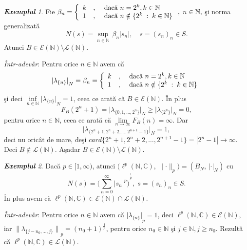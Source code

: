 \documentclass[ a4paper, 12pt]{report}
\theoremstyle{definition}
\theoremstyle{remark}
\newtheorem{exemple}{\bf Exemplul}[section]
\numberwithin{equation}{section}
\begin{document}
\begin{exemple}
Fie $\beta_n= \left\{ \begin{array}{lcl} k&,& \hbox{ dac\u a } n= 2^k, k \in \mathbb{N} \\
1 &,& \hbox{ dac\u a } n \notin \{ 2^k \; : \; k \in \mathbb{N}\} \end{array} \right., \; n \in \mathbb{N},$ \c si norma generalizat\u a
$$N(s) = \sup\limits_{n \in \mathbb{N}}\, {\beta_n  \lvert s_n \rvert}, \quad s= (s_n)_n \in S.$$
Atunci $B \in \mathcal{E}(\mathbb{N}) \setminus \mathcal{L}(\mathbb{N})$.
\end{exemple}

{\it \^ Intr-adev\u ar}: Pentru orice $n \in \mathbb{N}$ avem c\u a
$${\lvert \lambda_{\{n\}}\rvert}_N = \beta_n= \left\{ \begin{array}{lcl} k&,& \hbox{ dac\u a } n= 2^k, k \in \mathbb{N} \\
1 &,& \hbox{ dac\u a } n \notin \{ 2^k \; : \; k \in \mathbb{N}\} \end{array} \right.$$
\c si deci $\inf\limits_{n \in \mathbb{N}}{\lvert \lambda_{\{n\}}\rvert}_N=1$, ceea ce arat\u a c\u a $B \in \mathcal{E}(\mathbb{N})$. \^ In plus
$$F_B(2^n + 1) = \lvert \lambda_{\{0, 1, \ldots, 2^n \}} \rvert_N \geq  \lvert \lambda_{\{2^n \}} \rvert_N= 0,$$ pentru orice $n \in \mathbb{N}$, ceea ce arat\u a c\u a $\lim\limits_{n \rightarrow \infty} F_B(n)=\infty$. Dar
$$\lvert \lambda_{\{2^n + 1, 2^n + 2, \ldots, 2^{n + 1} - 1 \}} \rvert_N = 1, $$ deci nu oric\^ at de mare, de\c si $card\{2^n + 1, 2^n + 2, \ldots, 2^{n + 1} - 1 \} = |2^n - 1| \longrightarrow \infty$. Deci $B \notin \mathcal{L}(\mathbb{N})$. A\c sadar $B \in \mathcal{E}(\mathbb{N}) \setminus \mathcal{L}(\mathbb{N})$.

\begin{exemple}
Dac\u a $p \in [1,\infty)$, atunci $\big(\ell^p(\mathbb{N},\mathbb{C}), \, \lVert \cdot \rVert_p\big) = (B_N, \, \lvert\cdot \rvert_N)$ cu
$$N(s)={\big(\sum\limits_{n=0}^{\infty}{\lvert s_n \rvert}^p\big)}^{\frac{1}{p}}, \; s = (s_n)_n \in S.$$
\^ In plus avem c\u a $\ell^p(\mathbb{N},\mathbb{C}) \in \mathcal{E}(\mathbb{N}) \cap \mathcal{L}(\mathbb{N})$.
\end{exemple}

{\it \^Intr-adev\u ar}: Pentru orice $n \in \mathbb{N}$ avem c\u a ${\lvert \lambda_{\{n\}} \rvert}_p=1$, deci $\ell^p(\mathbb{N},\mathbb{C}) \in \mathcal{E}(\mathbb{N})$, iar  ${\lVert \lambda_{\{j-n_0,...,j\}} \rVert}_p={(n_0+1)}^\frac{1}{p}$, pentru orice $n_0 \in \mathbb{N}$ \c si $j \in \mathbb{N},j \geq n_0.$ Rezult\u a c\u a $\ell^p(\mathbb{N},\mathbb{C}) \in \mathcal{L}(\mathbb{N})$.
\end{document}
